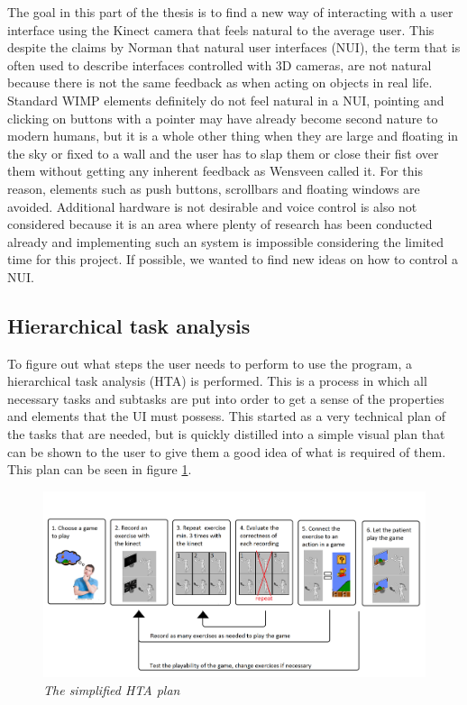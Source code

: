 The goal in this part of the thesis is to find a new way of interacting with a user interface using the Kinect camera that feels natural to the average user. This despite the claims by Norman \cite{Norman2010} that natural user interfaces (NUI), the term that is often used to describe interfaces controlled with 3D cameras, are not natural because there is not the same feedback as when acting on objects in real life. Standard WIMP elements definitely do not feel natural in a NUI, pointing and clicking on buttons with a pointer may have already become second nature to modern humans, but it is a whole other thing when they are large and floating in the sky or fixed to a wall and the user has to slap them or close their fist over them without getting any inherent feedback as Wensveen \cite{Wensveen2004} called it. For this reason, elements such as push buttons, scrollbars and floating windows are avoided. Additional hardware is not desirable and voice control is also not considered because it is an area where plenty of research has been conducted already and implementing such an system is impossible considering the limited time for this project. If possible, we wanted to find new ideas on how to control a NUI.\\


\subsection{Hierarchical task analysis}

To figure out what steps the user needs to perform to use the program, a hierarchical task analysis (HTA) is performed. This is a process in which all necessary tasks and subtasks are put into order to get a sense of the properties and elements that the UI must possess. This started as a very technical plan of the tasks that are needed, but is quickly distilled into a simple visual plan that can be shown to the user to give them a good idea of what is required of them. This plan can be seen in figure \ref{HTA}.\\

\begin{figure}[H]
	\begin{center}
		\includegraphics[width=14cm]{figures/HTA_plan.png}
		\caption{\emph{The simplified HTA plan}}
		\label{HTA}
	\end{center}
\end{figure}


